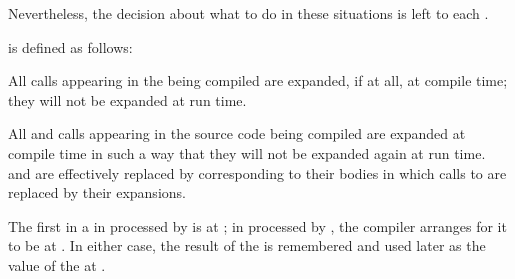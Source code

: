 Nevertheless, the decision about what to do in these situations is left to
each .

\endsubsubsubsubsection%

\endsubsubsubsection%

\endsubsubsection%




 is defined as follows:

\beginlist 
{}
\itemitem{\bull} All  calls appearing in the
 being compiled are expanded, if at all, at compile time;
they will not be expanded at run time.

 \itemitem{\bull} All  and 
 calls
appearing in the source code being compiled are expanded at compile time
in such a way that they will not be expanded again at run time.
and
are effectively replaced by
 corresponding to their bodies in which calls to 
 are replaced by their expansions.
 
\itemitem{\bull} 
The first  in a 
in  processed by 
is  at ;
in  processed by , 
the compiler arranges for it to be  at .
In either case, the result of the 
is remembered and used later as the value of the 
  at .

